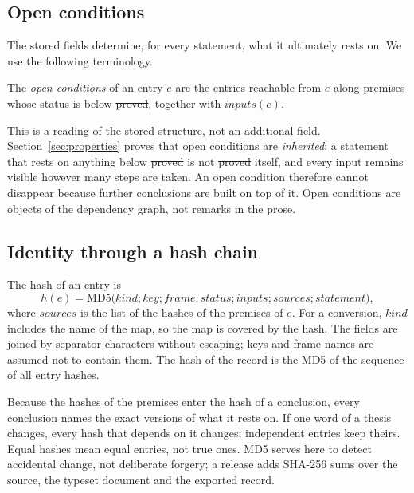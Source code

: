 \subsection{Open conditions}\label{sec:open}

The stored fields determine, for every statement, what it ultimately rests on. We use the following terminology.

\begin{definition}\label{def:open}
The \emph{open conditions} of an entry $e$ are the entries reachable from $e$ along premises whose status is below \st{proved},
together with $\mathit{inputs}(e)$.
\end{definition}

This is a reading of the stored structure, not an additional field. Section~\ref{sec:properties} proves that open conditions are
\emph{inherited}: a statement that rests on anything below \st{proved} is not \st{proved} itself, and every input remains visible however
many steps are taken.
An open condition therefore cannot disappear because further conclusions are built on top of it. Open conditions are objects of the
dependency graph, not remarks in the prose.

\subsection{Identity through a hash chain}

\begin{definition}\label{def:hash}
The hash of an entry is
\[
h(e)=\mathrm{MD5}\bigl(\mathit{kind};\mathit{key};\mathit{frame};\mathit{status};\mathit{inputs};\mathit{sources};\mathit{statement}\bigr),
\]
where $\mathit{sources}$ is the list of the hashes of the premises of $e$. For a conversion, $\mathit{kind}$ includes the name of
the map, so the map is covered by the hash. The fields are joined by separator characters without escaping; keys and frame names are
assumed not to contain them. The hash of the record is the MD5 of the sequence of all
entry hashes.
\end{definition}

Because the hashes of the premises enter the hash of a conclusion, every conclusion names the exact versions of what it rests on. If
one word of a thesis changes, every hash that depends on it changes; independent entries keep theirs. Equal hashes mean equal
entries, not true ones. MD5 serves here to detect accidental change, not deliberate forgery; a release adds SHA-256 sums over the
source, the typeset document and the exported record.

